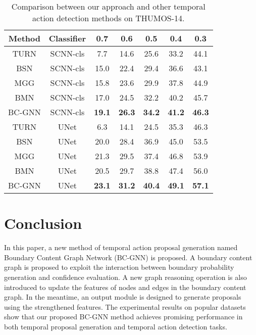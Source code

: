 \documentclass[runningheads]{llncs}
\begin{document}
\begin{table}

\setlength{\abovecaptionskip}{-1.5cm}
\setlength{\belowcaptionskip}{.3cm}
\begin{center}

\caption{Comparison between our approach and other temporal action detection methods on THUMOS-14.}
\setlength{\tabcolsep}{4mm}
\label{thumos detection}
\begin{tabular}{ccccccc}

\hline
Method & Classifier & 0.7  & 0.6  & 0.5  & 0.4  & 0.3  \\

\hline
TURN \cite{TURN} & SCNN-cls  & 7.7  & 14.6 & 25.6 & 33.2 & 44.1 \\
BSN \cite{BSN}  & SCNN-cls  & 15.0 & 22.4 & 29.4 & 36.6 & 43.1 \\
MGG \cite{MGG}  & SCNN-cls  & 15.8 & 23.6 & 29.9 & 37.8 & 44.9 \\
BMN \cite{BMN} & SCNN-cls  & 17.0 & 24.5 & 32.2 & 40.2 & 45.7 \\
\hline
BC-GNN & SCNN-cls  & \textbf{19.1}     & \textbf{26.3}     & \textbf{34.2}     & \textbf{ 41.2 }   & \textbf{46.3}     \\
\hline
TURN \cite{TURN} & UNet  & 6.3  & 14.1 & 24.5 & 35.3 & 46.3 \\
BSN \cite{BSN} & UNet  & 20.0 & 28.4 & 36.9 & 45.0 & 53.5 \\
MGG \cite{MGG}  & UNet  & 21.3 & 29.5 & 37.4 & 46.8 & 53.9 \\
BMN \cite{BMN} & UNet  & 20.5 & 29.7 & 38.8 & 47.4 & 56.0 \\
\hline
BC-GNN & UNet  &\textbf{23.1}   & \textbf{31.2}     & \textbf{40.4}     & \textbf{49.1}   & \textbf{57.1}     \\
\hline

\end{tabular}
\end{center}
\end{table}


\section{Conclusion}
In this paper, a new method of temporal action proposal generation named Boundary Content Graph Network (BC-GNN) is proposed. A boundary content graph is proposed to exploit the interaction between boundary probability generation and confidence evaluation. A new graph reasoning operation is also introduced to update the features of nodes and edges in the boundary content graph. In the meantime, an output module is designed to generate proposals using the strengthened features. The experimental results on popular datasets show that our proposed BC-GNN method achieves promising performance in both temporal proposal generation and temporal action detection tasks.
\clearpage



\end{document}
